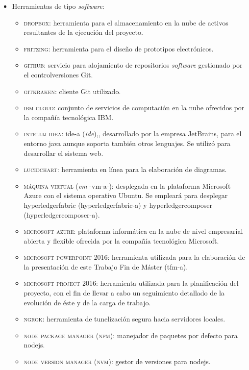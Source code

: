 \documentclass[12pt,a4paper, twoside]{report}
\begin{document}
	\begin{itemize}
		\item Herramientas de tipo \textit{software}:
		\begin{itemize}
			\item \textsc{dropbox:} herramienta para el almacenamiento en la nube de activos resultantes de la ejecución del proyecto.
			\item \textsc{fritzing:} herramienta para el diseño de \glspl{prototipo} electrónicos.
			\item \textsc{github:} servicio para alojamiento de repositorios \textit{software} gestionado por el \gls{controlversiones} Git.
			\item \textsc{gitkraken:} cliente Git utilizado.
			\item \textsc{ibm cloud:} conjunto de servicios de computación en la nube ofrecidos por la compañía tecnológica IBM.
			\item \textsc{intellij idea:} \gls{ide-a} (\textit{\gls{ide}}),, desarrollado por la empresa JetBrains, para el entorno \gls{java} aunque soporta también otros lenguajes. Se utilizó para desarrollar el sistema web.
			\item \textsc{lucidchart:} herramienta en línea para la elaboración de diagramas.
			\item \textsc{máquina virtual} (\textit{\gls{vm}} -\gls{vm-a}-): desplegada en la plataforma Microsoft Azure con el sistema operativo Ubuntu. Se empleará para desplegar \gls{hyperledgerfabric} (\gls{hyperledgerfabric-a}) y \gls{hyperledgercomposer} (\gls{hyperledgercomposer-a}).
			\item \textsc{microsoft azure:} plataforma informática en la nube de nivel empresarial abierta y flexible ofrecida por la compañía tecnológica Microsoft.
			\item \textsc{microsoft powerpoint 2016:} herramienta utilizada para la elaboración de la presentación de este Trabajo Fin de Máster (\gls{tfm-a}).
			\item \textsc{microsoft project 2016:} herramienta utilizada para la planificación del proyecto, con el fin de llevar a cabo un seguimiento detallado de la evolución de éste y de la carga de trabajo.
			\item \textsc{ngrok:} herramienta de tunelización segura hacia servidores locales.			
			\item \textsc{node package manager (npm):} manejador de paquetes por defecto para \gls{nodejs}.
			\item \textsc{node version manager (nvm):} gestor de versiones para \gls{nodejs}.

\end{itemize}
\end{itemize}
\end{document}

